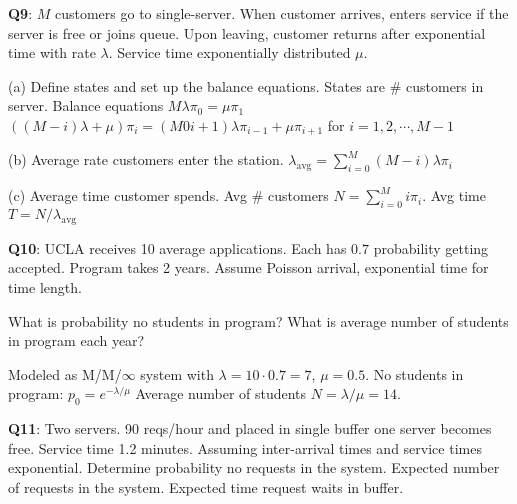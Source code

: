 \documentclass{scrartcl}
\begin{document}
\begin{multicols*}{3}
{\bf Q9}: $M$ customers go to single-server. When customer arrives, enters service if the server is free or joins queue. Upon leaving, customer returns after exponential time with rate $\lambda$. Service time exponentially distributed $\mu$.

(a) Define states and set up the balance equations. States are \# customers in server. Balance equations $M\lambda\pi_0=\mu\pi_1$\\$((M-i)\lambda+\mu)\pi_i=(M0i+1)\lambda\pi_{i-1}+\mu\pi_{i+1}$ for $i=1,2,\cdots,M-1$

(b) Average rate customers enter the station. $\lambda_{\text{avg}}=\sum_{i=0}^M(M-i)\lambda\pi_i$

(c) Average time customer spends. Avg \# customers $N=\sum_{i=0}^Mi\pi_i$. Avg time $T=N/\lambda_{\text{avg}}$



{\bf Q10}: UCLA receives 10 average applications. Each has $0.7$ probability getting accepted. Program takes 2 years. Assume Poisson arrival, exponential time for time length.

What is probability no students in program? What is average number of students in program each year?

Modeled as M/M/$\infty$ system with $\lambda=10\cdot 0.7=7$, $\mu=0.5$. No students in program: $p_0=e^{-\lambda/\mu}$ Average number of students $N=\lambda/\mu=14$.



{\bf Q11}: Two servers. 90 reqs/hour and placed in single buffer one server becomes free. Service time 1.2 minutes. Assuming inter-arrival times and service times exponential. Determine probability  no requests in the system. Expected number of requests in the system. Expected time request waits in buffer.




\end{multicols*}
\end{document}

